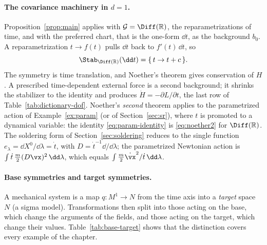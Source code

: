 \paragraph{The covariance machinery in $d=1$.}
Proposition~\ref{prop:main} applies with $\mathcal G=\Diff(\mathbb R)$, the
reparametrizations of time, and with the preferred chart, that is the one-form
$\dd t$, as the background $b_0$. A reparametrization $t\to f(t)$ pulls $\dd t$
back to $f'(t)\,\dd t$, so
\begin{equation}
  \Stab_{\Diff(\mathbb R)}(\dd t)=\{\,t\to t+c\,\}.
\end{equation}
The symmetry is time translation, and Noether's theorem gives conservation of
$H$. A prescribed time-dependent external force is a second background; it
shrinks the stabilizer to the identity and produces $\dot H=-\partial L/\partial t$,
the last row of Table~\ref{tab:dictionary-dof}. Noether's \emph{second}
theorem applies to the parametrized action of Example~\ref{ex:param} (or of
Section~\ref{sec:sr}), where $t$ is promoted to a dynamical variable: the
identity \eqref{eq:param-identity} is \eqref{eq:noether2} for
$\Diff(\mathbb R)$. The soldering form of Section~\ref{sec:soldering} reduces
to the single function $e_\lambda=\dd X^0/\dd\lambda=\dot t$, with
$D=\dot t^{-1}\dd/\dd\lambda$; the parametrized Newtonian action is
$\int\dot t\,\tfrac m2(D\vx)^2\,\dd\lambda$, which equals $\int\tfrac m2\dot\vx^2/\dot t\,\dd\lambda$.

\paragraph{Base symmetries and target symmetries.}
A mechanical system is a map $q\colon M^1\to N$ from the time axis into a
\emph{target} space $N$ (a sigma model). Transformations then split into those
acting on the base, which change the arguments of the fields, and those acting
on the target, which change their values. Table~\ref{tab:base-target} shows
that the distinction covers every example of the chapter.

